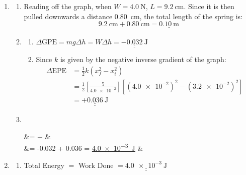 \documentclass[11pt]{article}
\def\doubleunderline#1{\underline{\underline{#1}}}
\begin{document}
\begin{enumerate}[label={[D\arabic*]},itemsep={1em}]
\begin{enumerate}
\begin{enumerate}[label={(\roman*)}]
						The height is naturally just the extension $x$, since at \SI{6}{\centi\meter}, there isn't any weight on the spring and the spring is at its natural unstretched length. 
						
						Thus,
						\begin{equation*}
							E = \frac{1}{2}\left(kx\right)\left(x\right) = \doubleunderline{\frac{1}{2}kx^2}
						\end{equation*}
					\end{enumerate}
				\item 
					\begin{enumerate}[label={(\roman*)}]
						\item 
							Reading off the graph, when $W=\SI{4.0}{\newton}$, $L = \SI{9.2}{\centi\meter}$. Since it is then pulled downwards a distance \SI{0.80}{\centi\meter}, the total length of the spring is:$$\SI{9.2}{\centi\meter} + \SI{0.80}{\centi\meter} = \doubleunderline{\SI{0.10}{\meter}}$$
						\item 
							\begin{enumerate}[label={\arabic*.}]
								\item $\Delta \text{GPE} = mg\Delta h = W\!\Delta h =  \doubleunderline{\SI{-0.032}{\joule}}$
								\item Since $k$ is given by the negative inverse gradient of the graph:
								\begin{align*}
									\Delta \text{EPE} &= \frac{1}{2}k\left(x_{\!f}^2 - x_i^2\right) \\[0.3em]
									&= \frac{1}{2}\left[\frac{5}{\num{4.0e-2}}\right]\left[\left(\num{4.0e-2}\right)^2 - \left(\num{3.2e-2}\right)^2\right] \\
									&= \doubleunderline{+\SI{0.036}{\joule}}
								\end{align*}
							\end{enumerate}
						\item \textcolor{white}{.}
							\vspace{-2.2em}
							\begin{flalign*}
								 &= \Delta {} + \Delta {} &\\
								&= -0.032 + 0.036 = \doubleunderline{\SI{4.0e-3}{\joule}} &
							\end{flalign*}
					\end{enumerate}
				\item 
					\begin{enumerate}[label={(\roman*)}]
						\item Total Energy $=$ Work Done $= \doubleunderline{\SI{4.0e-3}{\joule}}$

\end{enumerate}
\end{enumerate}
\end{enumerate}
\end{document}
